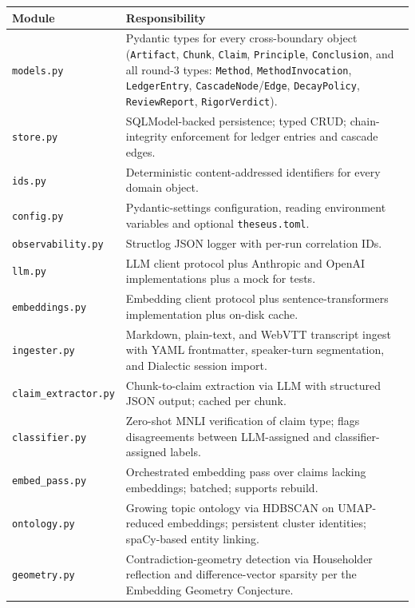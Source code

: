 \documentclass[11pt,letterpaper]{article}
\newcommand{\file}[1]{\texttt{#1}}
\newcommand{\mod}[1]{\texttt{#1}}
\begin{document}
\begin{longtable}{p{3.6cm} p{10.9cm}}
\toprule
\textbf{Module} & \textbf{Responsibility} \\
\midrule
\endhead
\mod{models.py}             & Pydantic types for every cross-boundary object (\texttt{Artifact}, \texttt{Chunk}, \texttt{Claim}, \texttt{Principle}, \texttt{Conclusion}, and all round-3 types: \texttt{Method}, \texttt{MethodInvocation}, \texttt{LedgerEntry}, \texttt{CascadeNode}/\texttt{Edge}, \texttt{DecayPolicy}, \texttt{ReviewReport}, \texttt{RigorVerdict}). \\
\mod{store.py}              & SQLModel-backed persistence; typed CRUD; chain-integrity enforcement for ledger entries and cascade edges. \\
\mod{ids.py}                & Deterministic content-addressed identifiers for every domain object. \\
\mod{config.py}             & Pydantic-settings configuration, reading environment variables and optional \file{theseus.toml}. \\
\mod{observability.py}      & Structlog JSON logger with per-run correlation IDs. \\
\mod{llm.py}                & LLM client protocol plus Anthropic and OpenAI implementations plus a mock for tests. \\
\mod{embeddings.py}         & Embedding client protocol plus sentence-transformers implementation plus on-disk cache. \\
\mod{ingester.py}           & Markdown, plain-text, and WebVTT transcript ingest with YAML frontmatter, speaker-turn segmentation, and Dialectic session import. \\
\mod{claim\_extractor.py}   & Chunk-to-claim extraction via LLM with structured JSON output; cached per chunk. \\
\mod{classifier.py}         & Zero-shot MNLI verification of claim type; flags disagreements between LLM-assigned and classifier-assigned labels. \\
\mod{embed\_pass.py}        & Orchestrated embedding pass over claims lacking embeddings; batched; supports rebuild. \\
\mod{ontology.py}           & Growing topic ontology via HDBSCAN on UMAP-reduced embeddings; persistent cluster identities; spaCy-based entity linking. \\
\mod{geometry.py}           & Contradiction-geometry detection via Householder reflection and difference-vector sparsity per the Embedding Geometry Conjecture. \\

\end{longtable}
\end{document}
